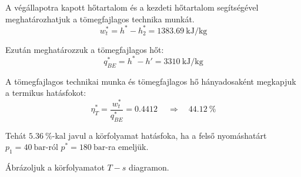 \noindent A végállapotra kapott hőtartalom és a kezdeti hőtartalom segítségével meghatározhatjuk a tömegfajlagos technika munkát.
\begin{equation}
w_t^* = h^*- h_2^* = \SI{1383,69}{\kilo\joule\per\kilogram}
\end{equation}

\noindent Ezután meghatározzuk a tömegfajlagos hőt:
\begin{equation}
q_{BE}^* = h^* - h' = \SI{3310}{\kilo\joule\per\kilogram}
\end{equation}

\noindent A tömegfajlagos technikai munka és tömegfajlagos hő hányadosaként megkapjuk a termikus hatásfokot:
\begin{equation}
\eta_{T}^* = \dfrac{w_t^*}{q_{BE}^*} = \SI{0,4412}{}
\quad 
\Rightarrow
\quad 
\SI{44,12}{\percent}
\end{equation}

\noindent Tehát $\SI{5,36}{\percent}$-kal javul a körfolyamat hatásfoka, ha a felső nyomáshatárt $p_1 = \SI{40}{\bar}$-ról $p^* = \SI{180}{\bar}$-ra emeljük.

\vspace{0.2cm}
\noindent Ábrázoljuk a körfolyamatot $T-s$ diagramon.

